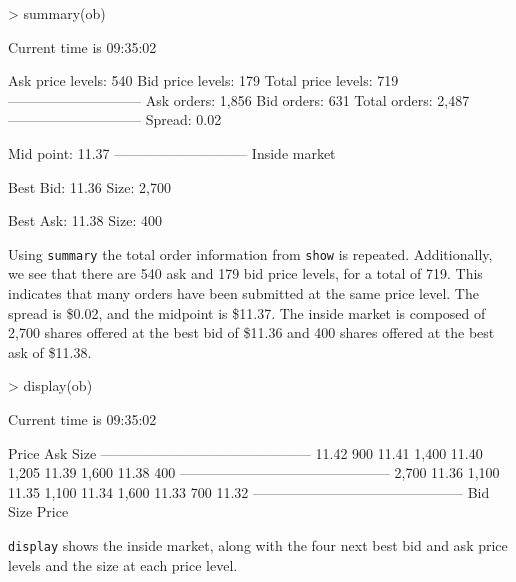 \begin{Schunk}
\begin{Sinput}
> summary(ob)
\end{Sinput}
\begin{Soutput}
Current time is 09:35:02

Ask price levels:   540
Bid price levels:   179
Total price levels: 719
-----------------------------
Ask orders:         1,856
Bid orders:         631
Total orders:       2,487
-----------------------------
Spread:             0.02

Mid point:          11.37
-----------------------------
Inside market

Best Bid:           11.36
Size:               2,700

Best Ask:           11.38
Size:               400
\end{Soutput}
\end{Schunk}

Using \texttt{summary} the total order information from \texttt{show}
is repeated. Additionally, we see that there are 540 ask and 179 bid
price levels, for a total of 719. This indicates that many orders
have been submitted at the same price level.  The spread is \$0.02,
and the midpoint is \$11.37. The inside market is composed of 2,700
shares offered at the best bid of \$11.36 and 400 shares offered at
the best ask of \$11.38.

\begin{Schunk}
\begin{Sinput}
> display(ob)
\end{Sinput}
\begin{Soutput}
Current time is 09:35:02

		 Price 	 Ask Size
---------------------------------------------
		 11.42 	 900
		 11.41 	 1,400
		 11.40 	 1,205
		 11.39 	 1,600
		 11.38 	 400
---------------------------------------------
  2,700 	 11.36
  1,100 	 11.35
  1,100 	 11.34
  1,600 	 11.33
    700 	 11.32
---------------------------------------------
Bid Size 	 Price
\end{Soutput}
\end{Schunk}

\texttt{display} shows the inside market, along with the four next
best bid and ask price levels and the size at each price level.

